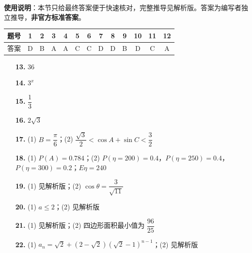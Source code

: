 
\begin{gknotice}
\textbf{使用说明}：本节只给最终答案便于快速核对，完整推导见解析版。答案为编写者独立推导，\textbf{非官方标准答案}。
\end{gknotice}

\begin{center}\begin{tabular}{ccccccccccccc}
\toprule
题号 & 1 & 2 & 3 & 4 & 5 & 6 & 7 & 8 & 9 & 10 & 11 & 12 \\
\midrule
答案 & D & B & A & A & C & C & D & D & B & D & C & A \\
\bottomrule
\end{tabular}\end{center}

\begin{itemize}[leftmargin=2.6em]
  \item[\textbf{13.}] $36$
  \item[\textbf{14.}] $3^x$
  \item[\textbf{15.}] $\dfrac13$
  \item[\textbf{16.}] $2\sqrt3$
\end{itemize}

\begin{itemize}[leftmargin=2.6em]
  \item[\textbf{17.}] (1) $B=\dfrac\pi6$；(2) $\dfrac{\sqrt3}{2}<\cos A+\sin C<\dfrac32$
  \item[\textbf{18.}] (1) $P(A)=0.784$；(2) $P(\eta=200)=0.4$，$P(\eta=250)=0.4$，$P(\eta=300)=0.2$；$E\eta=240$
  \item[\textbf{19.}] (1) 见解析版；(2) $\cos\theta=\dfrac3{\sqrt{11}}$
  \item[\textbf{20.}] (1) $a\leqslant2$；(2) 见解析版
  \item[\textbf{21.}] (1) 见解析版；(2) 四边形面积最小值为 $\dfrac{96}{25}$
  \item[\textbf{22.}] (1) $a_n=\sqrt2+(2-\sqrt2)(\sqrt2-1)^{n-1}$；(2) 见解析版
\end{itemize}

